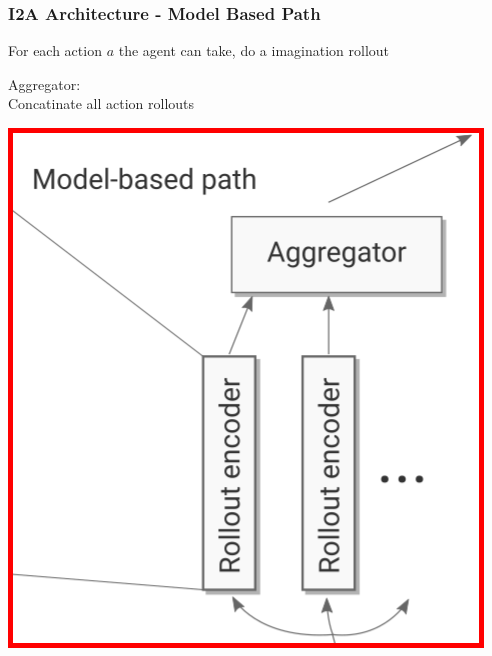 \begin{frame}
    \frametitle{I2A Architecture - Model Based Path}

\begin{multicols}{2}
	\begin{PraesentationAufzaehlung}
	    \item For each action $a$ the agent can take, do a imagination rollout 
		\item Aggregator: \\
		Concatinate all action rollouts
	\end{PraesentationAufzaehlung}
    \vfill\columnbreak
	\begin{center}
    \includegraphics[height=.5\textheight]{./Images/i2a_model_based.png}%
	\end{center}
\end{multicols}
    
\end{frame}
\clearpage




